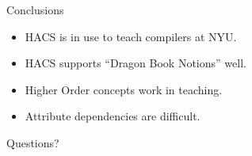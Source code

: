 \documentclass[pdftex,aspectratio=169,14pt]{beamer}
\begin{document}
\begin{frame}{Conclusions}

\begin{itemize}
\item HACS is in use to teach compilers at NYU.
\item HACS supports ``Dragon Book Notions'' well.
\item Higher Order concepts work in teaching.
\item Attribute dependencies are difficult.
\end{itemize}

\pause
\vspace*{2em}
\begin{center}
\alert{Questions?}
\end{center}

\end{frame}

\end{document}
